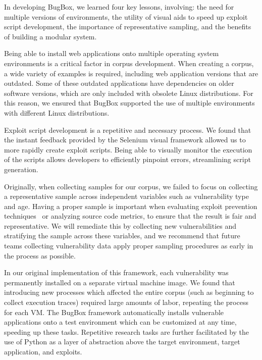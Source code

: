 \documentclass[letterpaper,twocolumn,10pt]{article}
\begin{document}
In developing BugBox, we learned four key lessons, involving: the need for multiple versions of environments, the utility of visual aids to speed up exploit script development, the importance of representative sampling, and the benefits of building a modular system.\par

Being able to install web applications onto multiple operating system environments is a critical factor in corpus development.  When creating a corpus, a wide variety of examples is required, including web application versions that are outdated.  Some of these outdated applications have dependencies on older software versions, which are only included with obsolete Linux distributions. For this reason, we ensured that BugBox supported the use of multiple environments with different Linux distributions.\par

Exploit script development is a repetitive and necessary process. We found that the instant feedback provided by the Selenium visual framework allowed us to more rapidly create exploit scripts.  Being able to visually monitor the execution of the scripts allows developers to efficiently pinpoint errors, streamlining script generation.  \par

Originally, when collecting samples for our corpus, we failed to focus on collecting a representative sample across independent variables such as vulnerability type and age. Having a proper sample is important when evaluating exploit prevention techniques~\cite{testbedpaper} or analyzing source code metrics, to ensure that the result is fair and representative. We will remediate this by collecting new vulnerabilities and stratifying the sample across these variables, and we recommend that future teams collecting vulnerability data apply proper sampling procedures as early in the process as possible.\par

In our original implementation of this framework, each vulnerability was permanently installed on a separate virtual machine image. We found that introducing new processes which affected the entire corpus (such as beginning to collect execution traces) required large amounts of labor, repeating the process for each VM. The BugBox framework automatically installs vulnerable applications onto a test environment which can be customized at any time, speeding up these tasks. Repetitive research tasks are further facilitated by the use of Python as a layer of abstraction above the target environment, target application, and exploits.
\end{document}
